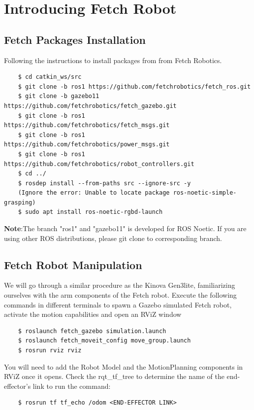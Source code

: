 \documentclass[12pt]{article}
\begin{document}
\section{Introducing Fetch Robot}

\subsection{Fetch Packages Installation}

Following the instructions to install packages from from Fetch Robotics.
\begin{verbatim}
    $ cd catkin_ws/src
    $ git clone -b ros1 https://github.com/fetchrobotics/fetch_ros.git
    $ git clone -b gazebo11 https://github.com/fetchrobotics/fetch_gazebo.git
    $ git clone -b ros1 https://github.com/fetchrobotics/fetch_msgs.git
    $ git clone -b ros1 https://github.com/fetchrobotics/power_msgs.git
    $ git clone -b ros1 https://github.com/fetchrobotics/robot_controllers.git
    $ cd ../
    $ rosdep install --from-paths src --ignore-src -y
    (Ignore the error: Unable to locate package ros-noetic-simple-grasping)
    $ sudo apt install ros-noetic-rgbd-launch
\end{verbatim}
\textbf{Note}:The branch "ros1" and "gazebo11" is developed for ROS Noetic. If you are using other ROS distributions, please git clone to corresponding branch.


\subsection{Fetch Robot Manipulation}
We will go through a similar procedure as the Kinova Gen3lite, familiarizing ourselves with the arm components of the Fetch robot. Execute the following commands in different terminals to spawn a Gazebo simulated Fetch robot, activate the motion capabilities and open an RViZ window

\begin{verbatim}
    $ roslaunch fetch_gazebo simulation.launch
    $ roslaunch fetch_moveit_config move_group.launch
    $ rosrun rviz rviz
\end{verbatim}

You will need to add the Robot Model and the MotionPlanning components in RViZ once it opens. Check the rqt\_tf\_tree to determine the name of the end-effector’s link to run the command:

\begin{verbatim}
    $ rosrun tf tf_echo /odom <END-EFFECTOR LINK>
\end{verbatim}
    
\end{document}
